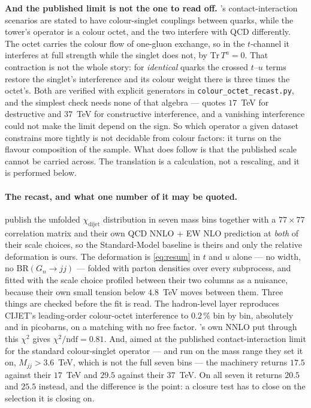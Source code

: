 \documentclass[11pt,a4paper]{article}
\begin{document}
\noindent\textbf{And the published limit is not the one to read off.} \cite{CMSangular}'s
contact-interaction scenarios are stated to have colour-singlet couplings between quarks, while
the tower's operator is a colour octet, and the two interfere with QCD differently. The octet
carries the colour flow of one-gluon exchange, so in the $t$-channel it interferes at full
strength while the singlet does not, by $\mathrm{Tr}\,T^a=0$. That contraction is not the whole
story: for \emph{identical} quarks the crossed $t$--$u$ terms restore the singlet's interference
and its colour weight there is three times the octet's. Both are verified with explicit
generators in \texttt{colour\_\allowbreak octet\_\allowbreak recast.py}, and the simplest check
needs none of that algebra --- \cite{CMSangular} quotes $17$~TeV for destructive and $37$~TeV for
constructive interference, and a vanishing interference could not make the limit depend on the
sign. So which operator a given dataset constrains more tightly is not decidable from colour
factors: it turns on the flavour composition of the sample. What does follow is that the
published scale cannot be carried across. The translation is a calculation, not a rescaling, and
it is performed below.

\paragraph{The recast, and what one number of it may be quoted.} \cite{CMSangular} publish the
unfolded $\chi_{\mathrm{dijet}}$ distribution in seven mass bins together with a $77\times77$
correlation matrix and their own QCD NNLO + EW NLO prediction at \emph{both} of their scale
choices, so the Standard-Model baseline is theirs and only the relative deformation is ours. The
deformation is \eqref{eq:resum} in $t$ and $u$ alone --- no width, no $\mathrm{BR}(G_n\to jj)$ ---
folded with parton densities over every subprocess, and fitted with the scale choice profiled
between their two columns as a nuisance, because their own small tension below $4.8$~TeV moves
between them. Three things are checked before the fit is read. The hadron-level layer reproduces
CIJET's leading-order colour-octet interference to $0.2\,\%$ bin by bin, absolutely and in
picobarns, on a matching with no free factor. \cite{CMSangular}'s own NNLO put through this
$\chi^2$ gives $\chi^2/\mathrm{ndf}=0.81$. And, aimed at the published contact-interaction limit
for the standard colour-singlet operator --- and run on the mass range they set it on, $M_{jj}>
3.6$~TeV, which is not the full seven bins --- the machinery returns $17.5$ against their $17$~TeV
and $29.5$ against their $37$~TeV. On all seven it returns $20.5$ and $25.5$ instead, and the
difference is the point: a closure test has to close on the selection it is closing on.
\end{document}
